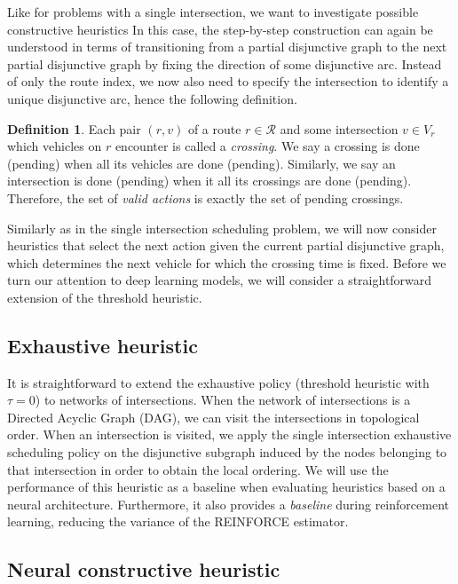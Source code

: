 \documentclass[a4paper]{article}
\theoremstyle{definition}
\newtheorem{define}{Definition}[section]
\theoremstyle{plain}
\begin{document}
Like for problems with a single intersection, we want to investigate possible
constructive heuristics In this case, the step-by-step construction can again be
understood in terms of transitioning from a partial disjunctive graph to the
next partial disjunctive graph by fixing the direction of some disjunctive arc.
Instead of only the route index, we now also need to specify the intersection to
identify a unique disjunctive arc, hence the following definition.

\begin{define}
  Each pair $(r, v)$ of a route $r \in \mathcal{R}$ and some intersection
  $v \in V_{r}$ which vehicles on $r$ encounter is called a \textit{crossing}.
  We say a crossing is done (pending) when all its vehicles are done (pending).
  Similarly, we say an intersection is done (pending) when it all its crossings
  are done (pending). Therefore, the set of \textit{valid actions} is exactly
  the set of pending crossings.
\end{define}

Similarly as in the single intersection scheduling problem, we will now consider
heuristics that select the next action given the current partial disjunctive
graph, which determines the next vehicle for which the crossing time is fixed.
Before we turn our attention to deep learning models, we will consider a
straightforward extension of the threshold heuristic.

\subsection{Exhaustive heuristic}

It is straightforward to extend the exhaustive policy (threshold heuristic with
$\tau = 0$) to networks of intersections. When the network of intersections is a
Directed Acyclic Graph (DAG), we can visit the intersections in topological
order. When an intersection is visited, we apply the single intersection
exhaustive scheduling policy on the disjunctive subgraph induced by the nodes
belonging to that intersection in order to obtain the local ordering.
%
We will use the performance of this heuristic as a baseline when evaluating
heuristics based on a neural architecture. Furthermore, it also provides a
\textit{baseline} during reinforcement learning, reducing the variance of the
REINFORCE estimator.

\subsection{Neural constructive heuristic}
\end{document}
